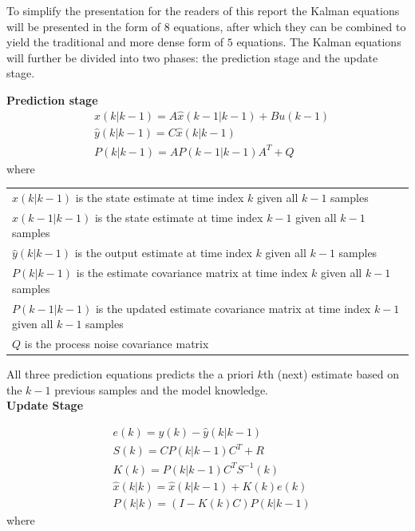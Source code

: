 To simplify the presentation for the readers of this report the Kalman equations will be presented in the form of $ 8  $ equations, after which they can be combined to yield the traditional and more dense form of $ 5 $ equations.
The Kalman equations will further be divided into two phases: the prediction stage and the update stage. 

\textbf{Prediction stage}
\begin{align}
	&\hat{{x}}	(k|k-1) = {A} 	\hat{{x}}(k-1|k-1) + {B}{u}(k-1)  				\label{eq:Kalman_pred_state} 	\\
	&\hat{{y}}	(k|k-1) = {C}	\hat{{x}}(k|k-1)										\label{eq:Kalman_pred_output} 	\\
	&{P}			(k|k-1) = {A}	{P}(k-1|k-1){A}^T+{Q} 							\label{eq:Kalman_pred_cov} 		
\end{align}
where 

\begin{center}
	\begin{tabular}{l}
		$ \hat{x}(k|k-1) $ is the state estimate at time index $ k $ given all $ k-1 $ samples	\\
		$ \hat{x}(k-1|k-1) $ is the state estimate at time index $ k-1  $ given all $ k-1 $ samples	\\
		$ \hat{y}(k|k-1) $ is the output estimate at time index $ k $ given all $ k-1 $ samples	\\
		$ P(k|k-1) $ is the estimate covariance matrix at time index $ k $	given all $ k-1 $ samples	\\
		$ P(k-1|k-1) $ is the updated estimate covariance matrix at time index $ k-1 $ given all $ k-1 $ samples	\\
		$Q$ is the process noise covariance matrix		
	\end{tabular}
\end{center}

All three prediction equations predicts the a priori $k$th (next) estimate based on the $k-1$ previous samples and the model knowledge.\\

\textbf{Update Stage}

\begin{align}
	&{e}			(k) 		= {y}(k) - \hat{{y}}(k|k-1)							\label{eq:Kalman_upd_inno}			\\
	&{S}			(k) 		= {C}{P}(k|k-1){C}^T + {R}				\label{eq:Kalman_upd_inno_cov}		\\
	&{K}			(k) 		= {P}(k|k-1){C}^T{S}^{-1}(k)					\label{eq:Kalman_upd_kalman_gain}	\\
	&\hat{{x}}	(k|k) 		= \hat{{x}}(k|k-1) + {K}(k){e}(k) 				\label{eq:Kalman_upd_est_state}		\\
	&{P}			(k|k) 		= ({I} - {K}(k){C}){P}(k|k-1)			\label{eq:Kalman_upd_est_cov}
\end{align}
where 


